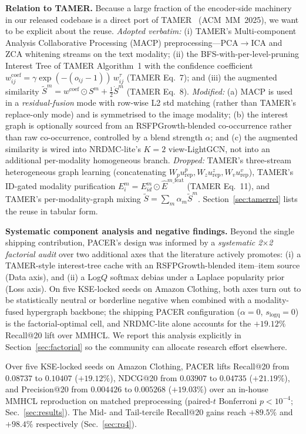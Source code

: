 \documentclass[conference]{IEEEtran}
\begin{document}
\smallskip
\noindent\textbf{Relation to TAMER.}
Because a large fraction of the encoder-side machinery in our released
codebase is a direct port of
TAMER~\cite{meng2025tamer} (ACM~MM~2025), we want to be explicit
about the reuse. \emph{Adopted verbatim:} (i) TAMER's Multi-component
Analysis Collaborative Processing (MACP) preprocessing---PCA$\to$ICA
and ZCA whitening streams on the text modality; (ii) the
BFS-with-per-level-pruning Interest Tree of TAMER Algorithm~1 with the
confidence coefficient $w_{ij}^{\text{coef}}{=}\gamma\exp(-(o_{ij}-1))\,w_{ij}^{\tau}$ (TAMER Eq.~7); and (iii) the augmented similarity
$\tilde S^{m}{=}w^{\text{coef}}\odot S^{m}+\tfrac{1}{2}\dot S^{m}$
(TAMER Eq.~8). \emph{Modified:} (a) MACP is used in a
\emph{residual-fusion} mode with row-wise L2 std matching (rather
than TAMER's replace-only mode) and is symmetrised to the image
modality; (b) the interest graph is optionally sourced from an
RSFPGrowth-blended co-occurrence rather than raw co-occurrence,
controlled by a blend strength $\alpha$; and (c) the augmented
similarity is wired into NRDMC-lite's $K{=}2$ view-LightGCN, not into
an additional per-modality homogeneous branch. \emph{Dropped:}
TAMER's three-stream heterogeneous graph learning (concatenating
$W_{p}u^{p}_{\text{rep}}, W_{z}u^{z}_{\text{rep}}, W_{v}u^{v}_{\text{rep}}$), TAMER's ID-gated modality purification $E_{i}^{m}=E_{id}^{m}\odot\hat E^{m\_\text{feat}}$ (TAMER Eq.~11), and TAMER's
per-modality-graph mixing $\tilde S{=}\sum_{m}\alpha_{m}\tilde S^{m}$.
Section~\ref{sec:tamerrel} lists the reuse in tabular form.

\smallskip
\noindent\textbf{Systematic component analysis and negative findings.}
Beyond the single shipping contribution, PACER's design was informed
by a \emph{systematic 2$\times$2 factorial audit} over two additional
axes that the literature actively promotes: (i) a TAMER-style
interest-tree cache with an RSFPGrowth-blended item--item source
(Data axis), and (ii) a Log$Q$ softmax debias under a Laplace
popularity prior (Loss axis). On five KSE-locked seeds on Amazon
Clothing, both axes turn out to be statistically neutral or
borderline negative when combined with a modality-fused hypergraph
backbone; the shipping PACER configuration ($\alpha{=}0$,
$s_{\text{logq}}{=}0$) is the factorial-optimal cell, and NRDMC-lite
alone accounts for the $+19.12\%$ Recall@20 lift over MMHCL. We
report this analysis explicitly in Section~\ref{sec:factorial} so
the community can allocate research effort elsewhere.

Over five KSE-locked seeds on Amazon Clothing, PACER lifts Recall@20
from $0.08737$ to $0.10407$ ($+19.12\%$), NDCG@20 from $0.03907$ to
$0.04735$ ($+21.19\%$), and Precision@20 from $0.004426$ to
$0.005268$ ($+19.03\%$) over an in-house MMHCL reproduction on
matched preprocessing (paired-$t$ Bonferroni $p<10^{-4}$;
Sec.~\ref{sec:results}). The Mid- and Tail-tercile Recall@20 gains
reach $+89.5\%$ and $+98.4\%$ respectively (Sec.~\ref{sec:rq4}).
\end{document}
